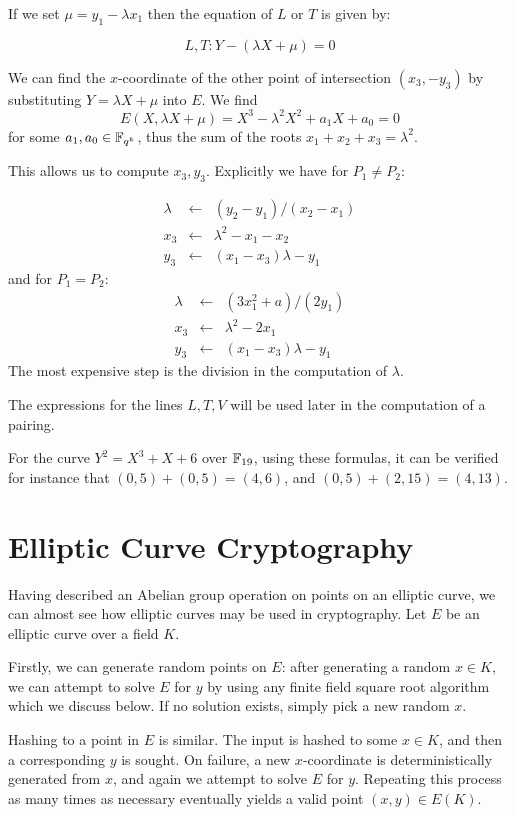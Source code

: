 If we set $\mu = y_1 - \lambda x_1$ then
the equation of $L$ or $T$ is given by:

\[ L, T :  Y - (\lambda X + \mu) = 0 \]

We can find the $x$-coordinate of the other point of intersection $(x_3, -y_3)$
by substituting $Y = \lambda X + \mu$ into $E$. We find
\[ E(X, \lambda X+\mu) = X^3 - \lambda^2 X^2 + a_1 X + a_0 = 0 \]
for some $a_1, a_0 \in \mathbb{F}_{q^k}$, thus the sum of the roots
$x_1 + x_2 + x_3 = \lambda^2$.

This allows us to compute $x_3, y_3$. Explicitly we have for $P_1 \ne P_2$:

\[
\begin{array}{rcl}
\lambda &\leftarrow& (y_2 - y_1)/(x_2 - x_1) \\
x_3 &\leftarrow& \lambda^2 - x_1 - x_2 \\
y_3 &\leftarrow& (x_1 - x_3) \lambda - y_1
\end{array}
\]
and for $P_1 = P_2$:
\[
\begin{array}{rcl}
\lambda &\leftarrow& (3x_1^2 + a)/(2y_1) \\
x_3 &\leftarrow& \lambda^2 - 2x_1 \\
y_3 &\leftarrow& (x_1 - x_3) \lambda - y_1
\end{array}
\]
The most expensive step is the division in the computation of
$\lambda$.

The expressions for the lines $L,T,V$ will be used later in the computation
of a pairing.

For the curve $Y^2 = X^3 + X + 6$ over $\mathbb{F}_{19}$,
using these formulas, it can be verified for instance that
$(0, 5) + (0, 5) = (4, 6)$,
and $(0, 5) + (2, 15) = (4, 13)$.

\section {Elliptic Curve Cryptography}

Having described an Abelian group operation on points on an elliptic curve,
we can almost see how elliptic curves may be used in cryptography.
Let $E$ be an elliptic curve over a field $K$.

Firstly, we can generate random points on $E$:
after generating a random $x \in K$, we can attempt to solve $E$ for $y$ by
using any finite field square root algorithm which we discuss below.
If no solution exists, simply pick a new random $x$.

Hashing to a point in $E$ is similar. The input is hashed to some
$x \in K$, and then a corresponding $y$ is sought. On failure,
a new $x$-coordinate is deterministically generated from $x$, and again
we attempt to solve $E$ for $y$. Repeating this process as many times as
necessary eventually yields a valid point $(x,y) \in E(K)$.

